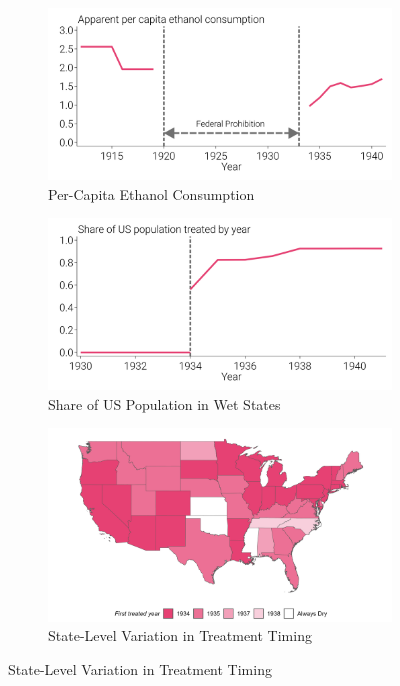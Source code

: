 \documentclass[12pt]{article}
\begin{document}
\begin{landscape}
\begin{figure}[!ht]
    \caption[Alcohol Consumption, Prohibition Status, and Age-Adjusted Mortality]{Alcohol Consumption, Prohibition Status, and Age-Adjusted Mortality}
    \centering
    \begin{subfigure}{0.45\linewidth}
        \centering 
        \caption[Per-Capita Ethanol Consumption]{Per-Capita Ethanol Consumption}
        \includegraphics[width=1.0\linewidth]{../analysis/output/main/figure_1a_ethanol_consumption.png}
    \end{subfigure}
    \begin{subfigure}{0.45\linewidth}
        \centering 
        \caption[Share of US Population in Wet States]{Share of US Population in Wet States}
        \includegraphics[width=1.0\linewidth]{../analysis/output/main/figure_1b_shr_pop_treated.png}
    \end{subfigure}
    \begin{subfigure}{0.45\linewidth}
        \centering 
        \caption[State-Level Variation in Treatment Timing]{State-Level Variation in Treatment Timing}        
        \includegraphics[width=1.0\linewidth]{../analysis/output/main/figure_1c_wet_map.png}

\end{subfigure}
\end{figure}
\end{landscape}
\end{document}
